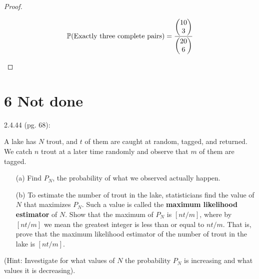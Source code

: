 \documentclass{article}
\begin{document}
\begin{proof}
\begin{itemize}
        \begin{align}
            \mathbb{P}(\text{Exactly three complete pairs})=\frac{\begin{pmatrix}10\\3\end{pmatrix}}{\begin{pmatrix}20\\6\end{pmatrix}}
        \end{align}
    \end{itemize}
\end{proof}

\newpage

\section*{6 Not done}
\begin{ques}\label{q6}
    2.4.44 (pg. 68):

    A lake has $N$ trout, and $t$ of them are caught at random, tagged, and returned. We catch $n$ trout at a later time randomly and observe that $m$ of them are tagged.
    \begin{itemize}
        \item[(a)] Find $P_N$, the probability of what we observed actually happen.
        \item[(b)] To estimate the number of trout in the lake, statisticians find the value of $N$ that maximizes $P_N$. Such a value is called the \textbf{maximum likelihood estimator} of $N$. Show that the maximum of $P_N$ is $[nt/m]$, where by $[nt/m]$ we mean the greatest integer is less than or equal to $nt/m$. That is, prove that the maximum likelihood estimator of the number of trout in the lake is $[nt/m]$. 
    \end{itemize}

    (Hint: Investigate for what values of $N$ the probability $P_N$ is increasing and what values it is decreasing).
\end{ques}
\end{document}
